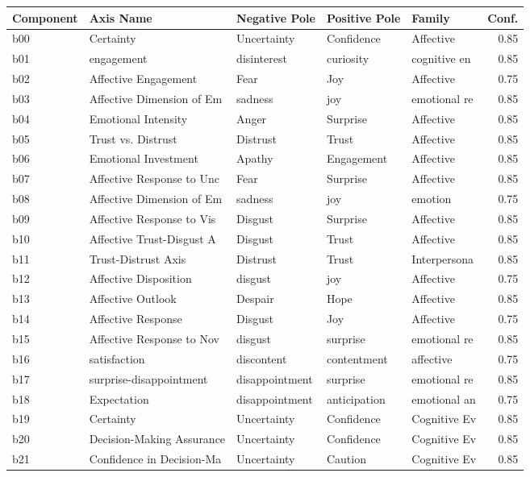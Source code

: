 \begin{table}[H]
\centering
\small
\begin{tabular}{|l|l|l|l|l|r|}
\hline
Component & Axis Name & Negative Pole & Positive Pole & Family & Conf. \\
\hline
b00 & Certainty & Uncertainty & Confidence & Affective & 0.85 \\
b01 & engagement & disinterest & curiosity & cognitive en & 0.85 \\
b02 & Affective Engagement & Fear & Joy & Affective & 0.75 \\
b03 & Affective Dimension of Em & sadness & joy & emotional re & 0.85 \\
b04 & Emotional Intensity & Anger & Surprise & Affective & 0.85 \\
b05 & Trust vs. Distrust & Distrust & Trust & Affective & 0.85 \\
b06 & Emotional Investment & Apathy & Engagement & Affective & 0.85 \\
b07 & Affective Response to Unc & Fear & Surprise & Affective & 0.85 \\
b08 & Affective Dimension of Em & sadness & joy & emotion & 0.75 \\
b09 & Affective Response to Vis & Disgust & Surprise & Affective & 0.85 \\
b10 & Affective Trust-Disgust A & Disgust & Trust & Affective & 0.85 \\
b11 & Trust-Distrust Axis & Distrust & Trust & Interpersona & 0.85 \\
b12 & Affective Disposition & disgust & joy & Affective & 0.75 \\
b13 & Affective Outlook & Despair & Hope & Affective & 0.85 \\
b14 & Affective Response & Disgust & Joy & Affective & 0.75 \\
b15 & Affective Response to Nov & disgust & surprise & emotional re & 0.85 \\
b16 & satisfaction & discontent & contentment & affective & 0.75 \\
b17 & surprise-disappointment & disappointment & surprise & emotional re & 0.85 \\
b18 & Expectation & disappointment & anticipation & emotional an & 0.75 \\
b19 & Certainty & Uncertainty & Confidence & Cognitive Ev & 0.85 \\
b20 & Decision-Making Assurance & Uncertainty & Confidence & Cognitive Ev & 0.85 \\
b21 & Confidence in Decision-Ma & Uncertainty & Caution & Cognitive Ev & 0.85 \\

\end{tabular}
\end{table}

